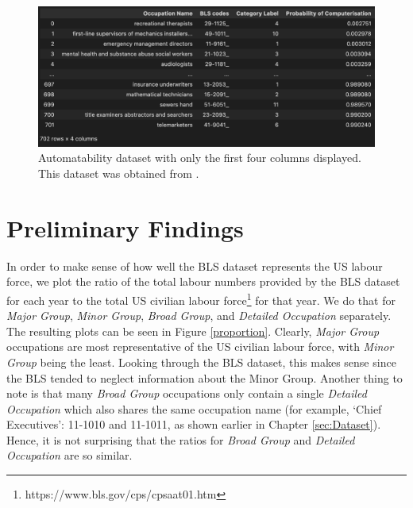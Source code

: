 \documentclass[11pt]{article}
\begin{document}
\begin{figure}[!htb]
	\centering
	\includegraphics[width=15cm]{Figures/Automatability dataset.png}
	\caption{Automatability dataset with only the first four columns displayed. This dataset was obtained from \cite{osborne2017future}.}
	\label{fig:autodata}
\end{figure}


\newpage

\section{Preliminary Findings}
\label{sec:prelim findings}

In order to make sense of how well the BLS dataset represents the US labour force, we plot the ratio of the total labour numbers provided by the BLS dataset for each year to the total US civilian labour force\footnote{https://www.bls.gov/cps/cpsaat01.htm} for that year. We do that for \emph{Major Group}, \emph{Minor Group}, \emph{Broad Group}, and \emph{Detailed Occupation} separately. The resulting plots can be seen in Figure \ref{proportion}. Clearly, \emph{Major Group} occupations are most representative of the US civilian labour force, with \emph{Minor Group} being the least. Looking through the BLS dataset, this makes sense since the BLS tended to neglect information about the Minor Group. Another thing to note is that many \emph{Broad Group} occupations only contain a single \emph{Detailed Occupation} which also shares the same occupation name (for example, `Chief Executives': 11-1010 and 11-1011, as shown earlier in Chapter \ref{sec:Dataset}). Hence, it is not surprising that the ratios for \emph{Broad Group} and \emph{Detailed Occupation} are so similar.
\end{document}
